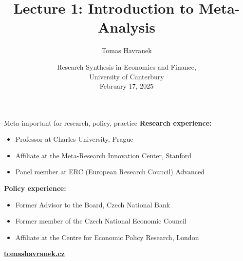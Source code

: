 \documentclass{beamer} %
\title[Lecture 1: Introduction] %
{Lecture 1: Introduction to Meta-Analysis}
\author[T.\ Havranek] %
{ Tomas Havranek
}
\institute[Prague] %
{
  	Charles University, CEPR, METRICS

  
}%
\date[Meta in Econ and Finance] %
{Research Synthesis in Economics and Finance, \\ University of Canterbury\\[2ex]
  February 17, 2025
}%
\begin{document}
\begin{frame}
  \titlepage
\end{frame}

\begin{frame}{Meta important for research, policy, practice}
\textbf{Research experience:}
\begin{itemize}
	\item Professor at Charles University, Prague
	\item Affiliate at the Meta-Research Innovation Center, Stanford
	\item Panel member at ERC (European Research Council) Advanced
\end{itemize}

\bigskip

\textbf{Policy experience:}

\begin{itemize}
	\item Former Advisor to the Board, Czech National Bank
	\item Former member of the Czech National Economic Council
	\item Affiliate at the Centre for Economic Policy Research, London
\end{itemize}

\bigskip

\href{https://tomashavranek.cz/}{\textbf{tomashavranek.cz}}
\end{frame}
\end{document}
